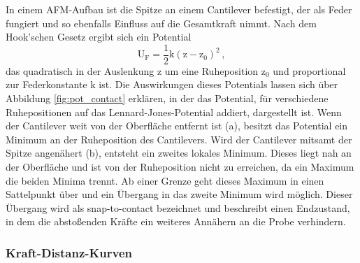           In einem AFM-Aufbau ist die Spitze an einem Cantilever befestigt, der als Feder fungiert und so ebenfalls Einfluss auf die Gesamtkraft nimmt. Nach dem Hook'schen Gesetz ergibt sich ein Potential 
          \begin{equation*}
            \text{U}_{\text{F}} = \frac{1}{2} \text{k} \left(\text{z} - \text{z}_0\right)^2 \, ,
          \end{equation*}
          das quadratisch in der Auslenkung z um eine Ruheposition z$_0$ und proportional zur Federkonstante k ist. 
          Die Auswirkungen dieses Potentials lassen sich über Abbildung \ref{fig:pot_contact} erklären, in der 
          das Potential, für verschiedene Ruhepositionen auf das Lennard-Jones-Potential addiert, dargestellt ist. Wenn der Cantilever weit von der Oberfläche entfernt ist (a), besitzt das Potential ein 
          Minimum an der Ruheposition des Cantilevers. Wird der Cantilever mitsamt der Spitze angenähert (b), entsteht ein zweites lokales Minimum. Dieses liegt nah an der Oberfläche und ist von der Ruheposition
          nicht zu erreichen, da ein Maximum die beiden Minima trennt. Ab einer Grenze geht dieses Maximum in einen Sattelpunkt über und ein Übergang in das zweite Minimum wird möglich. Dieser Übergang wird als
          snap-to-contact bezeichnet und beschreibt einen Endzustand, in dem die abstoßenden Kräfte ein weiteres Annähern an die Probe verhindern. 
          \FloatBarrier



        \newpage
        \subsubsection{Kraft-Distanz-Kurven}
        \label{sec:KraftAbstand}

